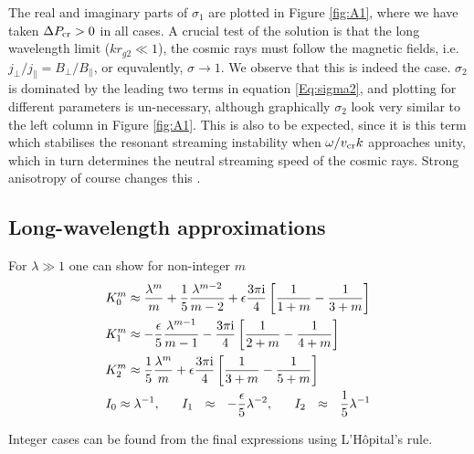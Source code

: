\documentclass[a4paper,fleqn,usenatbib]{mnras}
\begin{document}
The real and imaginary parts of $\sigma_1$ are plotted in Figure \ref{fig:A1}, where we have taken $\Delta P_{\rm cr} > 0$ in all cases. A crucial test of the solution is that the long wavelength limit ($kr_{g2} \ll 1$), the cosmic rays must follow the magnetic fields, i.e. $j_\bot/j_\| = B_\bot/B_\|$, or equvalently, $\sigma \rightarrow 1$. We observe that this is indeed the case.
  $\sigma_2$ is dominated by the leading two terms in equation \ref{Eq:sigma2}, and plotting for different parameters is un-necessary, although graphically $\sigma_2$ look very similar to the left column in Figure \ref{fig:A1}. This is also to be expected, since it is this term which stabilises the resonant streaming instability when $\omega/v_{\rm cr} k$ approaches unity,  which in turn determines the neutral streaming speed of the cosmic rays. Strong anisotropy of course changes this \cite[see for example][]{Zweibel20}.


 
 
 \subsection{Long-wavelength approximations}
 
 For $\lambda \gg 1$  one can show for non-integer $m$
\begin{align*}
&K_0^m \approx  \frac{\lambda^m}{m}+\frac{1}{5}  \frac{\lambda^{m-2}}{m-2}
   +\epsilon \frac{3\pi {\rm i}}{4}\left[ \frac{1}{1+m}- \frac{1}{3+m}\right]\\
& K_1^m \approx -\frac{\epsilon}{5}  \frac{\lambda^{m-1}}{m-1}
   - \frac{3\pi {\rm i}}{4}\left[ \frac{1}{2+m}- \frac{1}{4+m}\right]\\
& K_2^m  \approx  \frac{1}{5}  \frac{\lambda^{m}}{m}
   +\epsilon \frac{3\pi {\rm i}}{4}\left[ \frac{1}{3+m}- \frac{1}{5+m}\right]\\
 &I_0 \approx \lambda^{-1}, ~~~~~ I_1 ~~\approx~~ - \frac{\epsilon}{5}  \lambda^{-2}, ~~~~~ I_2 ~~\approx ~~\frac{1}{5}  \lambda^{-1}
\end{align*}


Integer cases can be found from the final expressions using L'H\^opital's rule. 
 
\end{document}

